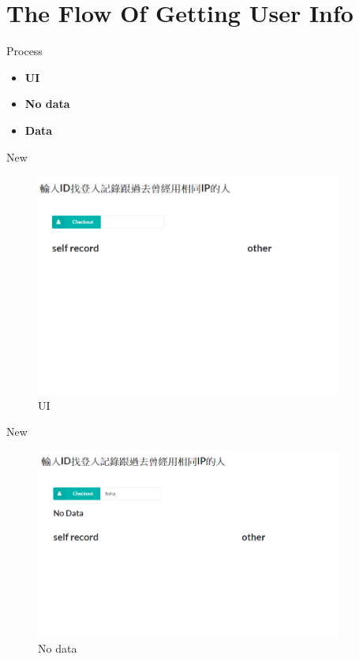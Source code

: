 \documentclass{beamer}
\begin{document}
\section{The Flow Of Getting User Info}

\begin{frame} {Process}
    \begin{itemize}
        \item \textbf{UI}
        \item \textbf{No data}
        \item \textbf{Data} 
    \end{itemize}
\end{frame}


\begin{frame} {New}
\begin{figure}[t]
    \centering
    \includegraphics[width=0.9\textwidth]{figures/w1.png}
    \caption{UI}
\end{figure}
\end{frame}

\begin{frame} {New}
\begin{figure}[t]
    \centering
    \includegraphics[width=0.9\textwidth]{figures/w3.png}
    \caption{No data}
\end{figure}
\end{frame}
\end{document}
